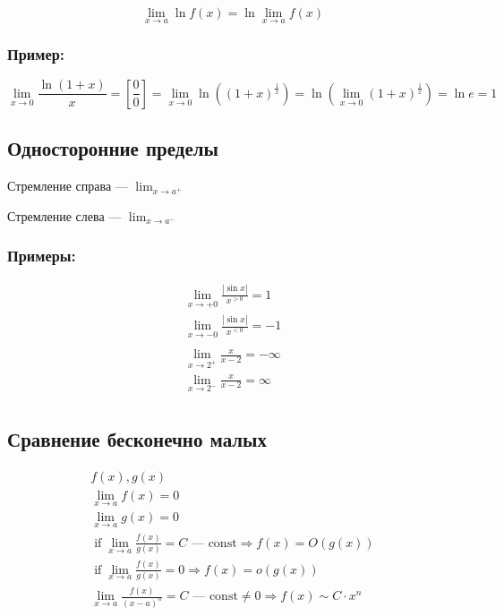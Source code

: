 \documentclass{article}
\DeclareMathOperator*{\If}{if}
\begin{document}
\[
\lim_{x \to a} \ln{f(x)} = \ln{\lim_{x \to a} f(x)}
\]

\subsubsection*{Пример:}

\[
\lim_{x \to 0} \frac{\ln(1 + x)}{x} = \left[ \frac{0}{0} \right] =
\lim_{x \to 0} \ln \left((1 + x)^{\frac{1}{x}}\right) = 
\ln \left(\lim_{x \to 0} (1 + x)^\frac{1}{x}\right) = \ln e = 1
\]

\subsection{Односторонние пределы}

Стремление справа --- $\lim_{x \to a^{+}}$

Стремление слева --- $\lim_{x \to a^{-}}$

\subsubsection*{Примеры:}

\begin{gather*}
	\lim_{x \to +0} \frac{|\sin x|}{x^{>0}} = 1 \\
	\lim_{x \to -0} \frac{|\sin x|}{x^{<0}} = -1 \\
\end{gather*}
\begin{gather*}
	\lim_{x \to 2^{+}} \frac{x}{x-2} = -\infty \\
	\lim_{x \to 2^{-}} \frac{x}{x-2} = \infty \\
\end{gather*}

\subsection{Сравнение бесконечно малых}

\begin{gather*}
	f(x), g(x) \\
	\lim_{x \to a} f(x) = 0 \\
	\lim_{x \to a} g(x) = 0 \\
	\If \lim_{x \to a} \frac{f(x)}{g(x)} = C \text{ --- const}
	\Rightarrow f(x) = O(g(x)) \\
	\If \lim_{x \to a} \frac{f(x)}{g(x)} = 0
	\Rightarrow f(x) = o(g(x)) \\
	\lim_{x \to a} \frac{f(x)}{(x - a)^n} = C \text{ --- const} \ne 0
	\Rightarrow f(x) \sim C \cdot x^n
\end{gather*}
\end{document}
